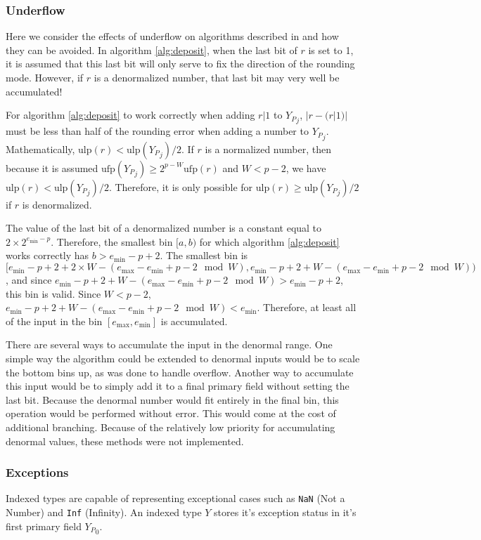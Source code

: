 \documentclass[12pt]{article}
\providecommand{\min}{\ensuremath{\text{min}}}
\providecommand{\max}{\ensuremath{\text{max}}}
\providecommand{\ulp}{\ensuremath{\text{ulp}}}
\providecommand{\ufp}{\ensuremath{\text{ufp}}}
\theoremstyle{plain}
\begin{document}
    \subsubsection{Underflow}
      \label{sec:underflow}
      Here we consider the effects of underflow on algorithms described in \cite{repsum} and how they can be avoided. In algorithm \ref{alg:deposit}, when the last bit of $r$ is set to 1, it is assumed that this last bit will only serve to fix the direction of the rounding mode. However, if $r$ is a denormalized number, that last bit may very well be accumulated!

      For algorithm \ref{alg:deposit} to work correctly when adding $r | 1$ to ${Y_P}_j$, $|r - (r | 1)|$ must be less than half of the rounding error when adding a number to ${Y_P}_j$. Mathematically, $\ulp(r) < \ulp({Y_P}_j)/2$.
      If $r$ is a normalized number, then because it is assumed $\ufp({Y_P}_j) \geq 2^{p - W}\ufp(r)$ and $W < p - 2$, we have $\ulp(r) < \ulp({Y_P}_j)/2$. Therefore, it is only possible for $\ulp(r) \geq \ulp({Y_P}_j)/2$ if $r$ is denormalized.

      The value of the last bit of a denormalized number is a constant equal to $2 \times 2^{e_{\min} - p}$. Therefore, the smallest bin $[a, b)$ for which algorithm \ref{alg:deposit} works correctly has $b > e_{\min} - p + 2$. The smallest bin is $[e_{\min} - p + 2 + 2\times W - (e_{\max} - e_{\min} + p - 2 \mod W), e_{\min} - p + 2 + W - (e_{\max} - e_{\min} + p - 2 \mod W))$, and since $e_{\min} - p + 2 + W - (e_{\max} - e_{\min} + p - 2 \mod W) > e_{\min} - p + 2$, this bin is valid.
      Since $W < p - 2$, $e_{\min} - p + 2 + W - (e_{\max} - e_{\min} + p - 2 \mod W) < e_{\min}$. Therefore, at least all of the input in the bin $[e_{\max}, e_{\min}]$ is accumulated.

      There are several ways to accumulate the input in the denormal range. One simple way the algorithm could be extended to denormal inputs would be to scale the bottom bins up, as was done to handle overflow. Another way to accumulate this input would be to simply add it to a final primary field without setting the last bit. Because the denormal number would fit entirely in the final bin, this operation would be performed without error. This would come at the cost of additional branching. Because of the relatively low priority for accumulating denormal values, these methods were not implemented.

    \subsubsection{Exceptions}
      Indexed types are capable of representing exceptional cases such as \verb|NaN| (Not a Number) and \verb|Inf| (Infinity). An indexed type $Y$ stores it's exception status in it's first primary field ${Y_P}_0$.
\end{document}
